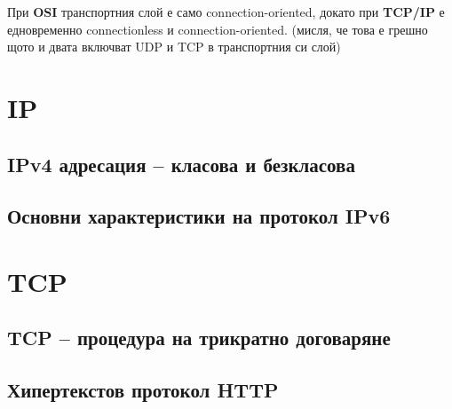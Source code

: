 \documentclass[fleqn,12pt]{article}
\begin{document}
\begin{flushleft}
При \textbf{OSI} транспортния слой е само connection-oriented, докато при \textbf{TCP/IP} е едновременно connectionless и connection-oriented. (мисля, че това е грешно щото и двата включват UDP и TCP в транспортния си слой)

\section{IP}
\subsection{IPv4 адресация – класова и безкласова}
\subsection{Основни характеристики на протокол IPv6}

\section{TCP}
\subsection{TCP – процедура на трикратно договаряне}
\subsection{Хипертекстов протокол HTTP}

\end{flushleft}
\end{document}
